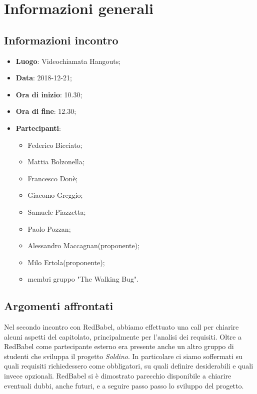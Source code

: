 \section{Informazioni generali}

\subsection{Informazioni incontro}
\begin{itemize}
\item \textbf{Luogo}: Videochiamata Hangouts;
\item \textbf{Data}: 2018-12-21;
\item \textbf{Ora di inizio}: 10.30;
\item \textbf{Ora di fine}: 12.30;
\item \textbf{Partecipanti}:
\begin{itemize}
	\item Federico Bicciato;
	\item Mattia Bolzonella;
	\item Francesco Donè;
	\item Giacomo Greggio;
	\item Samuele Piazzetta;
	\item Paolo Pozzan;
	\item Alessandro Maccagnan(proponente);
	\item Milo Ertola(proponente);
	\item membri gruppo "The Walking Bug".
\end{itemize}
\end{itemize}

\subsection{Argomenti affrontati}
Nel secondo incontro con RedBabel, abbiamo effettuato una call per chiarire alcuni aspetti del capitolato, principalmente per l'analisi dei requisiti.
Oltre a RedBabel come partecipante esterno era presente anche un altro gruppo di studenti che sviluppa il progetto \textit{Soldino}.
In particolare ci siamo soffermati su quali requisiti richiedessero come obbligatori, su quali definire desiderabili e quali invece opzionali.
RedBabel si è dimostrato parecchio disponibile a chiarire eventuali dubbi, anche futuri, e a seguire passo passo lo sviluppo del progetto.

